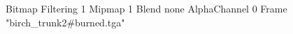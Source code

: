 {Bitmap
	{Filtering 1}
	{Mipmap 1}
	{Blend none}
	{AlphaChannel 0}
	{Frame "birch_trunk2#burned.tga"}
}
